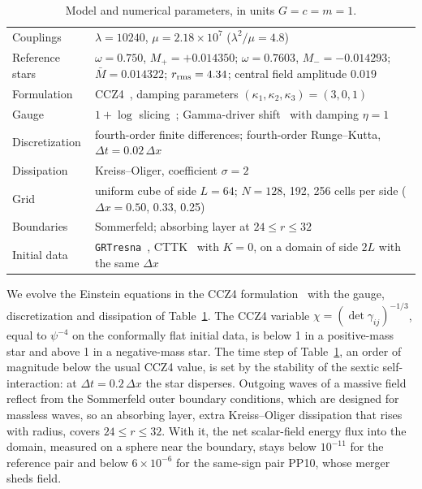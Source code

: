 \documentclass[twocolumn,floatfix,aps,prd,superscriptaddress,nofootinbib]{revtex4-2}
\begin{document}
\begin{table}[t]
\caption{Model and numerical parameters, in units $G=c=m=1$.}
\label{tab:params}
\begin{ruledtabular}
\begin{tabular}{lp{}}
Couplings & $\lambda=10240$, $\mu=2.18\times10^{7}$ ($\lambda^2/\mu=4.8$) \\
Reference stars & $\omega=0.750$, $M_+=+0.014350$; $\omega=0.7603$, $M_-=-0.014293$; $\bar M=0.014322$; $r_{\rm rms}=4.34$; central field amplitude $0.019$ \\
Formulation & CCZ4~\cite{alic2012}, damping parameters $(\kappa_1,\kappa_2,\kappa_3)=(3,0,1)$ \\
Gauge & $1{+}\log$ slicing~\cite{bona1995}; Gamma-driver shift~\cite{campanelli2006,baker2006} with damping $\eta=1$ \\
Discretization & fourth-order finite differences; fourth-order Runge--Kutta, $\Delta t=0.02\,\Delta x$ \\
Dissipation & Kreiss--Oliger, coefficient $\sigma=2$ \\
Grid & uniform cube of side $L=64$; $N=128$, 192, 256 cells per side ($\Delta x=0.50$, 0.33, 0.25) \\
Boundaries & Sommerfeld; absorbing layer at $24\le r\le32$ \\
Initial data & \texttt{GRTresna}~\cite{grtresna}, CTTK~\cite{cttk} with $K=0$, on a domain of side $2L$ with the same $\Delta x$ \\
\end{tabular}
\end{ruledtabular}
\end{table}

We evolve the Einstein equations in the CCZ4 formulation~\cite{alic2012} with the gauge, discretization and dissipation of Table~\ref{tab:params}. The CCZ4 variable $\chi=(\det\gamma_{ij})^{-1/3}$, equal to $\psi^{-4}$ on the conformally flat initial data, is below 1 in a positive-mass star and above 1 in a negative-mass star. The time step of Table~\ref{tab:params}, an order of magnitude below the usual CCZ4 value, is set by the stability of the sextic self-interaction: at $\Delta t=0.2\,\Delta x$ the star disperses. Outgoing waves of a massive field reflect from the Sommerfeld outer boundary conditions, which are designed for massless waves, so an absorbing layer, extra Kreiss--Oliger dissipation that rises with radius, covers $24\le r\le32$. With it, the net scalar-field energy flux into the domain, measured on a sphere near the boundary, stays below $10^{-11}$ for the reference pair and below $6\times10^{-6}$ for the same-sign pair PP10, whose merger sheds field.
\end{document}
